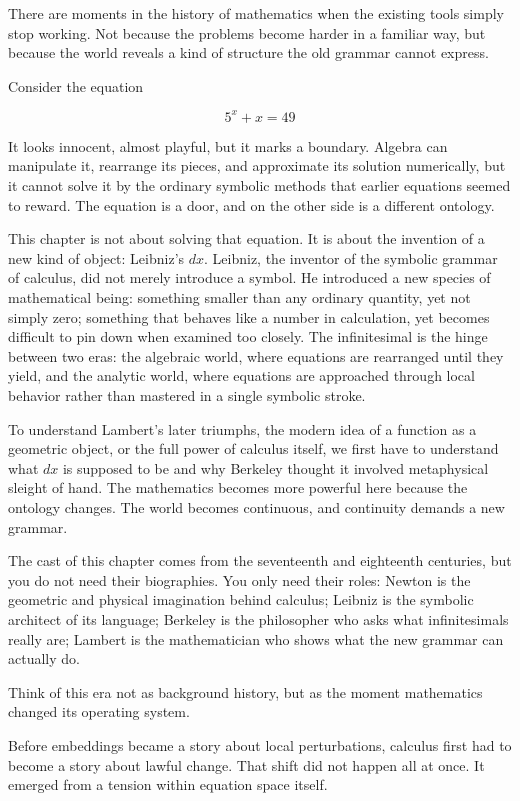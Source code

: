 There are moments in the history of mathematics when the existing tools
simply stop working. Not because the problems become harder in a
familiar way, but because the world reveals a kind of structure the old
grammar cannot express.

Consider the equation

\[
5^x + x = 49
\]

It looks innocent, almost playful, but it marks a boundary. Algebra can
manipulate it, rearrange its pieces, and approximate its solution
numerically, but it cannot solve it by the ordinary symbolic methods
that earlier equations seemed to reward. The equation is a door, and on
the other side is a different ontology.

This chapter is not about solving that equation. It is about the
invention of a new kind of object: Leibniz's \(dx\). Leibniz, the
inventor of the symbolic grammar of calculus, did not merely introduce a
symbol. He introduced a new species of mathematical being: something
smaller than any ordinary quantity, yet not simply zero; something that
behaves like a number in calculation, yet becomes difficult to pin down
when examined too closely. The infinitesimal is the hinge between two
eras: the algebraic world, where equations are rearranged until they
yield, and the analytic world, where equations are approached through
local behavior rather than mastered in a single symbolic stroke.

To understand Lambert's later triumphs, the modern idea of a function as
a geometric object, or the full power of calculus itself, we first have
to understand what \(dx\) is supposed to be and why Berkeley thought it
involved metaphysical sleight of hand. The mathematics becomes more
powerful here because the ontology changes. The world becomes
continuous, and continuity demands a new grammar.

The cast of this chapter comes from the seventeenth and eighteenth
centuries, but you do not need their biographies. You only need their
roles: Newton is the geometric and physical imagination behind calculus;
Leibniz is the symbolic architect of its language; Berkeley is the
philosopher who asks what infinitesimals really are; Lambert is the
mathematician who shows what the new grammar can actually do.

Think of this era not as background history, but as the moment
mathematics changed its operating system.

Before embeddings became a story about local perturbations, calculus
first had to become a story about lawful change. That shift did not
happen all at once. It emerged from a tension within equation space
itself.

